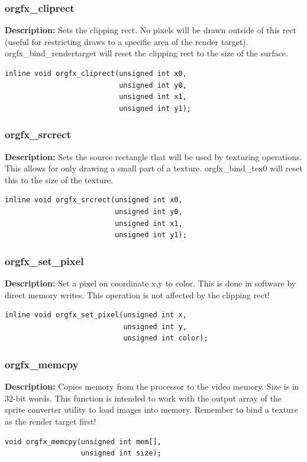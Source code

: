 \documentclass[10pt,a4paper]{article}
\begin{document}
\subsubsection{orgfx\_cliprect}
\textbf{Description:} Sets the clipping rect. No pixels will be drawn outside of this rect (useful for restricting draws to a specific area of the render target). orgfx\_bind\_rendertarget will reset the clipping rect to the size of the surface.
\begin{lstlisting}
inline void orgfx_cliprect(unsigned int x0,
                           unsigned int y0,
                           unsigned int x1,
                           unsigned int y1);
\end{lstlisting}

\subsubsection{orgfx\_srcrect}
\textbf{Description:} Sets the source rectangle that will be used by texturing operations. This allows for only drawing a small part of a texture. orgfx\_bind\_tex0 will reset this to the size of the texture.
\begin{lstlisting}
inline void orgfx_srcrect(unsigned int x0,
                          unsigned int y0,
                          unsigned int x1,
                          unsigned int y1);
\end{lstlisting}

\subsubsection{orgfx\_set\_pixel}
\textbf{Description:} Set a pixel on coordinate x,y to color. This is done in software by direct memory writes. This operation is not affected by the clipping rect!
\begin{lstlisting}
inline void orgfx_set_pixel(unsigned int x, 
                            unsigned int y, 
                            unsigned int color);
\end{lstlisting}

\subsubsection{orgfx\_memcpy}
\textbf{Description:} Copies memory from the processor to the video memory. Size is in 32-bit words. This function is intended to work with the output array of the sprite converter utility to load images into memory. Remember to bind a texture as the render target first!
\begin{lstlisting}
void orgfx_memcpy(unsigned int mem[],
                  unsigned int size);
\end{lstlisting}
\end{document}
